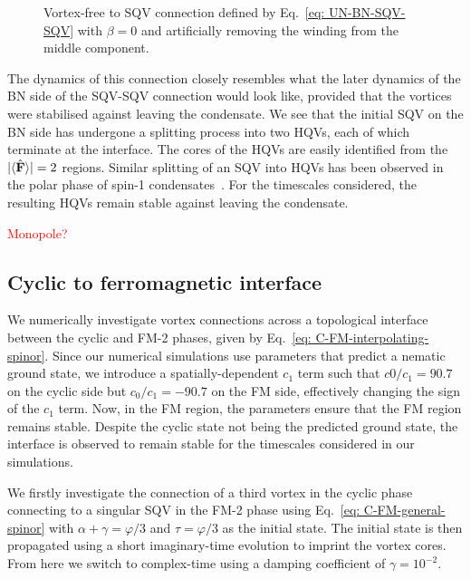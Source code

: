 \begin{figure}
\begin{subfigure}{0.45\textwidth}
        \caption{}
    \end{subfigure}
    \caption[Dynamics of a singly quantised vortex to vortex-free connection in
        a uniaxial nematic to biaxial nematic interface]
    {\label{fig: UN-BN-VF-SQV} Vortex-free to SQV connection defined
        by Eq.~\eqref{eq: UN-BN-SQV-SQV} with \(\beta=0\) and artificially
        removing the winding from the middle component.}
\end{figure}
The dynamics of this connection closely resembles what the later dynamics of the
BN side of the SQV-SQV connection would look like, provided that the vortices
were stabilised against leaving the condensate.
We see that the initial SQV on the BN side has undergone a splitting process
into two HQVs, each of which terminate at the interface.
The cores of the HQVs are easily identified from the
\(|\langle \hat{\vb{F}} \rangle | = 2\) regions.
Similar splitting of an SQV into HQVs has been observed in the polar phase of
spin-1 condensates~\cite{Seo2015, Xiao2021}.
For the timescales considered, the resulting HQVs remain stable against
leaving the condensate.

\textcolor{red}{Monopole?}

\subsection{Cyclic to ferromagnetic interface}
We numerically investigate vortex connections across a topological interface
between the cyclic and FM-2 phases, given by
Eq.~\eqref{eq: C-FM-interpolating-spinor}.
Since our numerical simulations use parameters that predict a nematic ground
state, we introduce a spatially-dependent \(c_1\) term such that \(c0/c_1=90.7\)
on the cyclic side but \(c_0/c_1=-90.7\) on the FM side, effectively changing
the sign of the \(c_1\) term.
Now, in the FM region, the parameters ensure that the FM region remains stable.
Despite the cyclic state not being the predicted ground state, the interface
is observed to remain stable for the timescales considered in our simulations.

We firstly investigate the connection of a third vortex in the cyclic phase
connecting to a singular SQV in the FM-2 phase using
Eq.~\eqref{eq: C-FM-general-spinor} with \(\alpha + \gamma = \varphi/3\) and
\(\tau=\varphi/3\) as the initial state.
The initial state is then propagated using a short imaginary-time evolution to
imprint the vortex cores.
From here we switch to complex-time using a damping coefficient of
\(\gamma=10^{-2}\).


